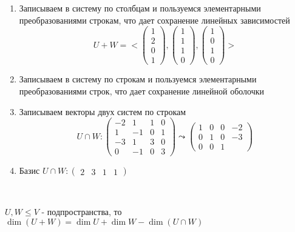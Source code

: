 \begin{problem}
\begin{solution}
    \begin{enumerate}
      \item Записываем в систему по столбцам и пользуемся элементарными преобразованиями строкам, что дает сохранение линейных зависимостей
        $$U + W = <
        \begin{pmatrix}
          1 \\ 2 \\ 0 \\ 1
        \end{pmatrix},
        \begin{pmatrix}
          1 \\ 1 \\ 1 \\ 0
        \end{pmatrix},
        \begin{pmatrix}
          1 \\ 0 \\ 1 \\ 0
        \end{pmatrix}>$$
      \item Записываем в систему по строкам и пользуемся элементарными преобразованиями строк, что дает сохранение линейной оболочки
      \item Записываем векторы двух систем по строкам
        $$U \cap W:
        \begin{pmatrix}
          -2 & 1 & 1 & 0 \\
          1 & -1 & 0 & 1 \\
          -3 & 1 & 3 & 0 \\
          0 & -1 & 0 & 3
        \end{pmatrix} \leadsto
        \begin{pmatrix}
          1 & 0 & 0 & -2 \\
          0 & 1 & 0 & -3 \\
          0 & 0 & 1 &
        \end{pmatrix}$$
      \item Базис $U \cap W:
        \begin{pmatrix}
          2 & 3 & 1 & 1
        \end{pmatrix}$
    \end{enumerate}

  \end{solution}

\end{problem}

\bigskip

\begin{theorem}~

  $U, W \leq V$ - подпространства, то $\dim(U + W) = \dim U + \dim W - \dim(U \cap W)$

  \begin{comment}~
    В частности, если из этих 4-ех чисел известо 3, то и 4-ое можно легко найти.

    Пэтому, если $U, W \in F^n$ заданы одним и тем же способом, то задача вычислить $\dim(U + W)$ и $\dim(U \cap W)$ решается легко
  \end{comment}

\end{theorem}

